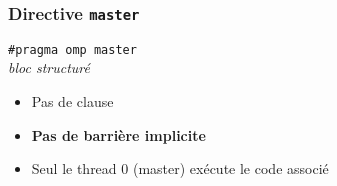 \documentclass{beamer}
\newcommand{\mynote}[1]{\note<1>[item]{#1}}
\begin{document}







\begin{frame}
  \frametitle{Directive {\tt master}} 

\begin{framed}
  {\tt \#pragma omp master }  \\
  {\it bloc structuré} 
\end{framed}


\bigskip

\begin{itemize}
\item Pas de clause

\item  \alert{\bfseries Pas de barrière implicite}

\item Seul le thread 0 (master) exécute le code associé
\end{itemize}
  
\end{frame}
\end{document}

